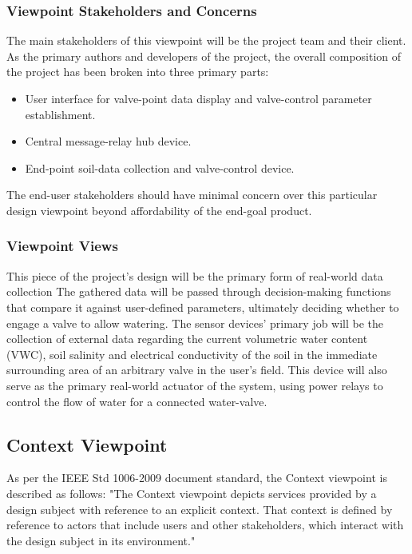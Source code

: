 \documentclass[onecolumn, draftclsnofoot,10pt, compsoc]{IEEEtran}
\newcounter{subsubsubsection}[subsubsection]
\begin{document}
        \subsubsection{Viewpoint Stakeholders and Concerns}
        The main stakeholders of this viewpoint will be the project team and their client.
        As the primary authors and developers of the project, the overall composition of the project has been broken into three primary parts:
        \begin{itemize}
        \item User interface for valve-point data display and valve-control parameter establishment.
        \item Central message-relay hub device.
        \item End-point soil-data collection and valve-control device.
        \end{itemize}
        The end-user stakeholders should have minimal concern over this particular design viewpoint beyond affordability of the end-goal product.
        \subsubsection{Viewpoint Views}
        This piece of the project's design will be the primary form of real-world data collection
        The gathered data will be passed through decision-making functions that compare it against user-defined parameters, ultimately deciding whether to engage a valve to allow watering.
        The sensor devices' primary job will be the collection of external data regarding the current volumetric water content (VWC), soil salinity and electrical conductivity of the soil in the immediate surrounding area of an arbitrary valve in the user's field.
        This device will also serve as the primary real-world actuator of the system, using power relays to control the flow of water for a connected water-valve.
        
        \subsection{Context Viewpoint}
        As per the IEEE Std 1006-2009 document standard, the Context viewpoint is described as follows: "The Context viewpoint depicts services provided by a design subject with reference to an explicit context. That context is defined by reference to actors that include users and other stakeholders, which interact with the  design  subject  in  its  environment."    
\end{document}
